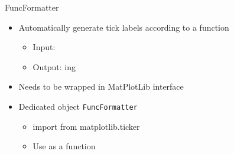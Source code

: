 
\begin{frame}[fragile]{FuncFormatter}
%
\begin{itemize}
\item Automatically generate tick labels according to a function
	\begin{itemize}
	\item Input: 
	\item Output: ing
	\end{itemize}
\item Needs to be wrapped in MatPlotLib interface
\item Dedicated object \texttt{FuncFormatter}
	\begin{itemize}
	\item import from matplotlib.ticker
	\item Use as a function
	\end{itemize}
\end{itemize}
%
\end{frame}


